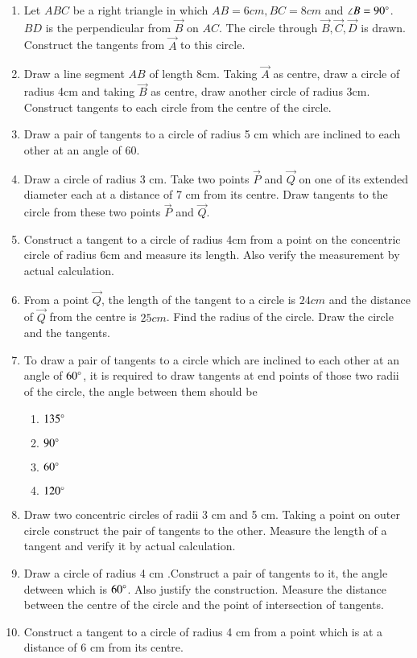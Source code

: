 \begin{enumerate}[label=\thesection.\arabic*,ref=\thesection.\theenumi]
\item 
\label{chapters/10/11/2/6}
Let $ABC$ be a right triangle in which $AB = 6 cm, BC = 8 cm$ and $\angle B = 90\degree$. $BD$ is the perpendicular from $\vec{B}$ on $AC$. The circle through $\vec{B}, \vec{C}, \vec{D}$ is drawn. Construct the tangents from $\vec{A}$ to this circle.
\item 
	Draw a line segment $AB$ of length 8cm. Taking $\vec{A}$ as centre, draw a circle of radius 4cm and taking $\vec{B}$ as centre, draw another circle of radius 3cm. Construct tangents to each circle from the centre of the circle.
\label{chapters/10/11/2/5}
\item 
	Draw a pair of tangents to a circle of radius 5 cm which are inclined to each other at an angle of 60\degree.
\label{chapters/10/11/2/4}
\item 
Draw a circle of radius 3 cm. Take two points $\vec{P}$ and $\vec{Q}$ on one of its extended diameter each at a distance of 7 cm from its centre. Draw tangents to the circle from these two points $\vec{P}$ and $\vec{Q}$.
\label{chapters/10/11/2/3}
\item 
	Construct a tangent to a circle of radius 4cm from a point on the concentric circle of radius 6cm and measure its length. Also verify the measurement by actual calculation.
\label{chapters/10/11/2/2}
\item From a point $\vec{Q}$, the length of the tangent to a circle is $24 cm$ and the distance of $\vec{Q}$ from the centre is $25 cm$. Find the radius of the circle. Draw the circle and the tangents. 
\label{chapters/10/10/2/1}
\item To draw a pair of tangents to a circle which are inclined to each other at an angle of $60\degree$, it is required
to draw tangents at end points of those two radii of the circle, the angle between them should be 
\begin{enumerate}
\item $135\degree$
\item $90\degree$
\item $60\degree$
\item $120\degree$ 
\end{enumerate}
\item Draw two concentric circles of radii 3 cm and 5 cm. Taking a point on outer circle construct the pair of tangents to the other. Measure the length of a tangent and verify it by actual calculation.
\item Draw a circle of radius 4 cm .Construct a pair of tangents to it, the angle detween which is $60\degree$. Also justify the construction. Measure the distance between the centre of the circle and the point of intersection of tangents.
\item Construct a tangent to a circle of radius 4 cm from a point which is at a distance of 6 cm from its centre.
\end{enumerate}
